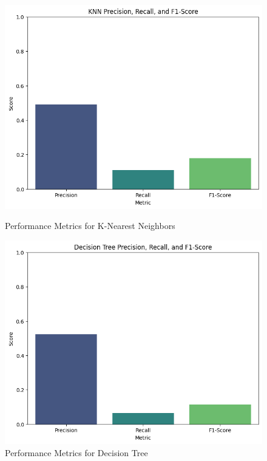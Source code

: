 \documentclass[a4paper,11pt]{article}
\begin{document}
\begin{figure}[h!]
    \centering
    \begin{minipage}{0.45\textwidth}
        \centering
        \includegraphics[width=\textwidth]{knn1.png}
        \caption{Performance Metrics for K-Nearest Neighbors}
        \label{fig:knn1}
    \end{minipage}
    \hfill
    \begin{minipage}{0.45\textwidth}
        \centering
        \includegraphics[width=\textwidth]{dt1.png}
        \caption{Performance Metrics for Decision Tree}
        \label{fig:dt1}
    \end{minipage}
\end{figure}
\end{document}

